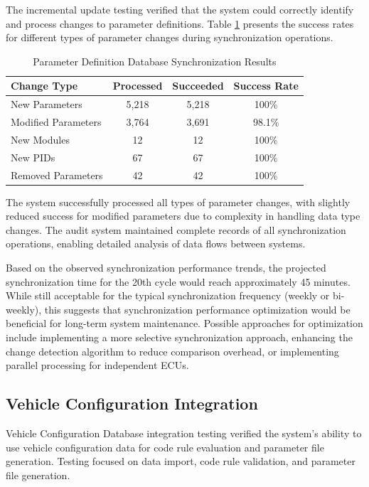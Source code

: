 The incremental update testing verified that the system could correctly identify and process changes to parameter definitions. Table \ref{tab:pdd-sync-results} presents the success rates for different types of parameter changes during synchronization operations.

\begin{table}[h]
\centering
\caption{Parameter Definition Database Synchronization Results}
\label{tab:pdd-sync-results}
\begin{tabular}{|l|c|c|c|}
\hline
\textbf{Change Type} & \textbf{Processed} & \textbf{Succeeded} & \textbf{Success Rate} \\
\hline
New Parameters & 5,218 & 5,218 & 100\% \\
\hline
Modified Parameters & 3,764 & 3,691 & 98.1\% \\
\hline
New Modules & 12 & 12 & 100\% \\
\hline
New \acp{PID} & 67 & 67 & 100\% \\
\hline
Removed Parameters & 42 & 42 & 100\% \\
\hline
\end{tabular}
\end{table}

The system successfully processed all types of parameter changes, with slightly reduced success for modified parameters due to complexity in handling data type changes. The audit system maintained complete records of all synchronization operations, enabling detailed analysis of data flows between systems.

Based on the observed synchronization performance trends, the projected synchronization time for the 20th cycle would reach approximately 45 minutes. While still acceptable for the typical synchronization frequency (weekly or bi-weekly), this suggests that synchronization performance optimization would be beneficial for long-term system maintenance. Possible approaches for optimization include implementing a more selective synchronization approach, enhancing the change detection algorithm to reduce comparison overhead, or implementing parallel processing for independent \acp{ECU}.

\subsection{Vehicle Configuration Integration}
\label{subsec:vehicle-configuration-testing}

Vehicle Configuration Database integration testing verified the system's ability to use vehicle configuration data for code rule evaluation and parameter file generation. Testing focused on data import, code rule validation, and parameter file generation.

